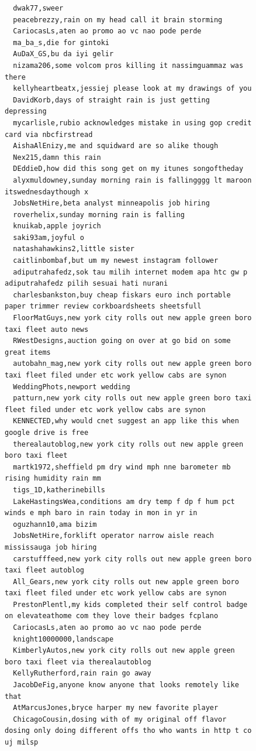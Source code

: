\begin{figure}[htpb]
\begin{verbatim}
  dwak77,sweer
  peacebrezzy,rain on my head call it brain storming
  CariocasLs,aten ao promo ao vc nao pode perde
  ma_ba_s,die for gintoki
  AuDaX_GS,bu da iyi gelir
  nizama206,some volcom pros killing it nassimguammaz was there
  kellyheartbeatx,jessiej please look at my drawings of you
  DavidKorb,days of straight rain is just getting depressing
  mycarlisle,rubio acknowledges mistake in using gop credit card via nbcfirstread
  AishaAlEnizy,me and squidward are so alike though
  Nex215,damn this rain
  DEddieD,how did this song get on my itunes songoftheday
  alyxmuldowney,sunday morning rain is fallingggg lt maroon itswednesdaythough x
  JobsNetHire,beta analyst minneapolis job hiring
  roverhelix,sunday morning rain is falling
  knuikab,apple joyrich
  saki93am,joyful o
  natashahawkins2,little sister
  caitlinbombaf,but um my newest instagram follower
  adiputrahafedz,sok tau milih internet modem apa htc gw p adiputrahafedz pilih sesuai hati nurani
  charlesbankston,buy cheap fiskars euro inch portable paper trimmer review corkboardsheets sheetsfull
  FloorMatGuys,new york city rolls out new apple green boro taxi fleet auto news
  RWestDesigns,auction going on over at go bid on some great items
  autobahn_mag,new york city rolls out new apple green boro taxi fleet filed under etc work yellow cabs are synon
  WeddingPhots,newport wedding
  patturn,new york city rolls out new apple green boro taxi fleet filed under etc work yellow cabs are synon
  KENNECTED,why would cnet suggest an app like this when google drive is free
  therealautoblog,new york city rolls out new apple green boro taxi fleet
  martk1972,sheffield pm dry wind mph nne barometer mb rising humidity rain mm
  tigs_1D,katherinebills
  LakeHastingsWea,conditions am dry temp f dp f hum pct winds e mph baro in rain today in mon in yr in
  oguzhann10,ama bizim
  JobsNetHire,forklift operator narrow aisle reach mississauga job hiring
  carstufffeed,new york city rolls out new apple green boro taxi fleet autoblog
  All_Gears,new york city rolls out new apple green boro taxi fleet filed under etc work yellow cabs are synon
  PrestonPlentl,my kids completed their self control badge on elevateathome com they love their badges fcplano
  CariocasLs,aten ao promo ao vc nao pode perde
  knight10000000,landscape
  KimberlyAutos,new york city rolls out new apple green boro taxi fleet via therealautoblog
  KellyRutherford,rain rain go away
  JacobDeFig,anyone know anyone that looks remotely like that
  AtMarcusJones,bryce harper my new favorite player
  ChicagoCousin,dosing with of my original off flavor dosing only doing different offs tho who wants in http t co uj milsp

\end{verbatim}
\end{figure}
